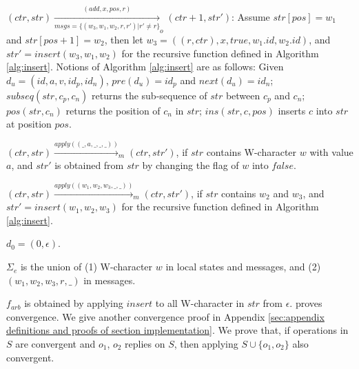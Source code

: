 {\begin{itemize}
{\item[-] $(\mathit{ctr},\mathit{str}) \xrightarrow[\mathit{msgs} = \{ (w_3,w_1,w_2,r,r') \vert r' \neq r \}]{(\mathit{add},x,\mathit{pos},r)}_o (\mathit{ctr}+1,\mathit{str}')$: Assume $\mathit{str}[\mathit{pos}]=w_1$ and $\mathit{str}[\mathit{pos}+1]=w_2$, then let $w_3 = ((r,\mathit{ctr}),x,\mathit{true},w_1.\mathit{id},w_2.\mathit{id})$, and $\mathit{str}' = \mathit{insert}(w_3,w_1,w_2)$ for the recursive function defined in Algorithm \ref{alg:insert}. Notions of Algorithm \ref{alg:insert} are as follows: Given $d_u = (\mathit{id},a,v,\mathit{id}_p,\mathit{id}_n)$, $\mathit{pre}(d_u) = \mathit{id}_p$ and $\mathit{next}(d_u)=\mathit{id}_n$; $\mathit{subseq}(\mathit{str},c_p,c_n)$ returns the sub-sequence of $\mathit{str}$ between $c_p$ and $c_n$; $\mathit{pos}(\mathit{str},c_n)$ returns the position of $c_n$ in $\mathit{str}$; $\mathit{ins}(\mathit{str},c,\mathit{pos})$ inserts $c$ into $\mathit{str}$ at position $\mathit{pos}$.

\item[-] $(\mathit{ctr},\mathit{str}) \xrightarrow{\mathit{apply}((\_,a,\_,\_,\_))}_m (\mathit{ctr},\mathit{str}')$, if $\mathit{str}$ contains W-character $w$ with value $a$, and $\mathit{str}'$ is obtained from $\mathit{str}$ by changing the flag of $w$ into $\mathit{false}$.

\item[-] $(\mathit{ctr},\mathit{str}) \xrightarrow{\mathit{apply}((w_1,w_2,w_3,\_,\_))}_m (\mathit{ctr},\mathit{str}')$, if $\mathit{str}$ contains $w_2$ and $w_3$, and $\mathit{str}' = \mathit{insert}(w_1,w_2,w_3)$ for the recursive function defined in Algorithm \ref{alg:insert}.
}

\item[-] $d_0 = (0,\epsilon)$.

\item[-] $\Sigma_e$ is the union of (1) W-character $w$ in local states and messages, and (2) $(w_1,w_2,w_3,r,\_)$ in messages.

\item[-] {\color {red}$f_{arb}$ is obtained by applying $\mathit{insert}$ to all W-character in $\mathit{str}$ from $\epsilon$. \cite{Oster:2006} proves convergence. We give another convergence proof in Appendix \ref{sec:appendix definitions and proofs of section implementation}. We prove that, if operations in $S$ are convergent and $o_1$, $o_2$ replies on $S$, then applying $S \cup \{ o_1,o_2 \}$ also convergent.}




\end{itemize}}
